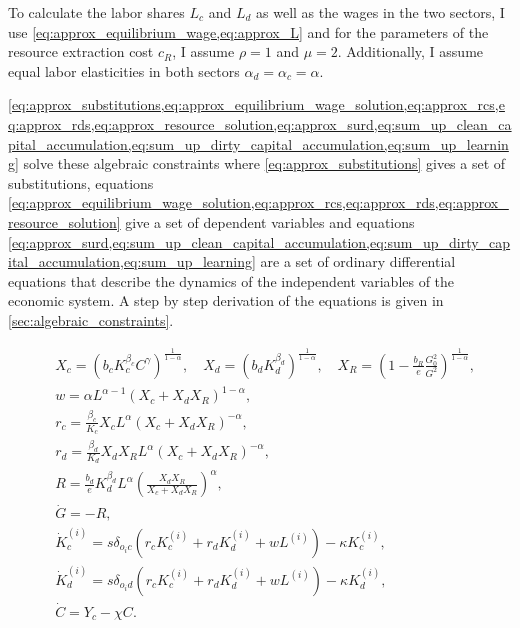 To calculate the labor shares $L_c$ and $L_d$ as well as the wages in the two sectors, I use 
\cref{eq:approx_equilibrium_wage,eq:approx_L} 
and for the parameters of the resource extraction cost $c_R$, I assume $\rho=1$ and $\mu=2$. Additionally, I assume equal labor elasticities in both sectors $\alpha_d = \alpha_c = \alpha$. 


\cref{eq:approx_substitutions,eq:approx_equilibrium_wage_solution,eq:approx_rcs,eq:approx_rds,eq:approx_resource_solution,eq:approx_surd,eq:sum_up_clean_capital_accumulation,eq:sum_up_dirty_capital_accumulation,eq:sum_up_learning} 
solve these algebraic constraints where 
\cref{eq:approx_substitutions} 
gives a set of substitutions, equations 
\cref{eq:approx_equilibrium_wage_solution,eq:approx_rcs,eq:approx_rds,eq:approx_resource_solution}
give a set of dependent variables and equations 
\cref{eq:approx_surd,eq:sum_up_clean_capital_accumulation,eq:sum_up_dirty_capital_accumulation,eq:sum_up_learning} 
are a set of ordinary differential equations that describe the dynamics of the independent variables of the economic system. A step by step derivation of the equations is given in \cref{sec:algebraic_constraints}.

\begin{subequations}\label{eq:parent}
\begin{align}
  &X_c = (b_c K_c^{\beta_c}C^{\gamma})^{\frac{1}{1-\alpha}}, \quad X_d = (b_d K_d^{\beta_d})^{\frac{1}{1-\alpha}}, \quad X_R = \left( 1 - \frac{b_R}{e}\frac{G_0^2}{G^2} \right)^{\frac{1}{1-\alpha}}, \label{eq:approx_substitutions}\\
&	w = \alpha L^{\alpha-1}\left( X_c + X_d X_R \right)^{1-\alpha}, \label{eq:approx_equilibrium_wage_solution}\\
 &       r_c = \frac{\beta_c}{K_c}X_c L^{\alpha}\left( X_c + X_d X_R \right)^{-\alpha}, \label{eq:approx_rcs} \\
  &      r_d = \frac{\beta_d}{K_d}X_d X_R L^{\alpha}\left( X_c + X_d X_R \right)^{-\alpha}, \label{eq:approx_rds}\\
   &     R = \frac{b_d}{e}K_d^{\beta_d}L^{\alpha}\left( \frac{X_d X_R}{X_c + X_d X_R} \right)^{\alpha}, \label{eq:approx_resource_solution}\\
&	\dot{G} = - R \label{eq:approx_surd}, \\ 
 &       \dot{K}_c^{(i)} = s \delta_{o_ic} (r_c K_c^{(i)} + r_d K_d^{(i)} + w L^{(i)}) - \kappa K_c^{(i)}, \label{eq:sum_up_clean_capital_accumulation} \\
  &    \dot{K}_d^{(i)} = s \delta_{o_id} (r_c K_c^{(i)} + r_d K_d^{(i)} + w L^{(i)}) - \kappa K_d^{(i)}, \label{eq:sum_up_dirty_capital_accumulation} \\
   &     \dot{C} = Y_c- \chi C.\label{eq:sum_up_learning}
\end{align}
\end{subequations}

